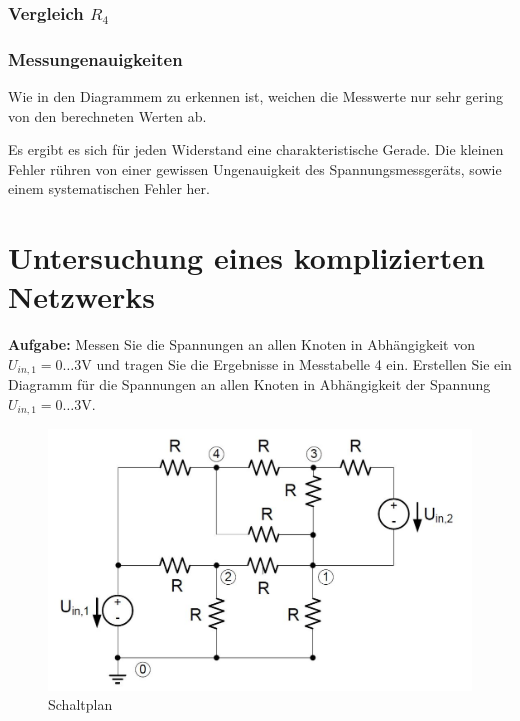 \documentclass[10pt]{report}
\begin{document}
        \subsubsection{Vergleich $R_4$}
        \begin{center}
        \end{center}


        \subsubsection{Messungenauigkeiten}
        Wie in den Diagrammem zu erkennen ist, weichen die Messwerte nur sehr
        gering von den berechneten Werten ab.

        Es ergibt es sich für jeden Widerstand eine charakteristische Gerade.
		Die kleinen Fehler rühren von einer gewissen Ungenauigkeit des Spannungsmessgeräts,
		sowie einem systematischen Fehler her.

        \section{Untersuchung eines komplizierten Netzwerks}
        \textbf{Aufgabe:} Messen Sie die Spannungen an allen
        Knoten in Abhängigkeit von $U_{in,1} = 0 \ldots 3 \si{\volt}$ und tragen Sie die Ergebnisse in Messtabelle
        4 ein. Erstellen Sie ein Diagramm für die Spannungen an allen Knoten in Abhängigkeit
        der Spannung $U_{in,1} = 0 \ldots 3 \si{\volt}$.
		
		\begin{figure}[H]
            \includegraphics[width=\textwidth]{KomplexesNetzwerk.jpg}
          \caption{Schaltplan}
        \end{figure}
		
\end{document}

